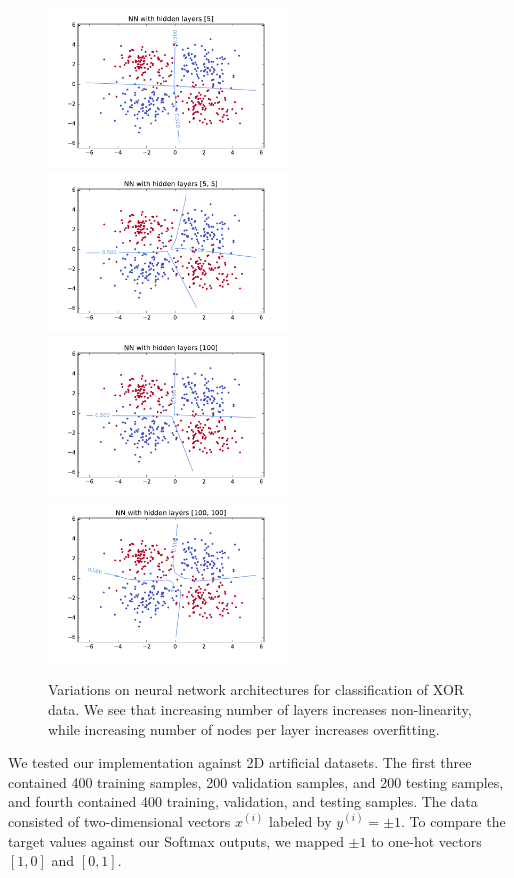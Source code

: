 \documentclass{article}
\newcommand{\sind}[1]{^{(#1)}}
\begin{document}
\begin{multicols}{2}
\begin{figure}[ht]
   \centering
   \includegraphics[width=2.5in]{img/p1/4-1small-382of400-16500.pdf}
   \includegraphics[width=2.5in]{img/p1/4-2small-380of400-3550.pdf}
   \includegraphics[width=2.5in]{img/p1/4-1large-380of400.pdf}
   \includegraphics[width=2.5in]{img/p1/4-2large-379of400-123000.pdf}
   \caption{Variations on neural network architectures for classification of
   XOR data. We see that increasing number of layers increases non-linearity,
   while increasing number of nodes per layer increases overfitting. 
   }
   \label{fig:1-2-arch}
\end{figure}

We tested our implementation against 2D artificial datasets.
The first three contained 400 training samples,
200 validation samples,
and 200 testing samples, and fourth contained 
400 training, validation, and testing samples.
The data consisted of two-dimensional vectors $x\sind{i}$ labeled by $y\sind{i} = \pm1$.
To compare the target values against our Softmax outputs, we mapped $\pm1$ to
one-hot vectors $[1,0]$ and $[0,1]$.


\end{multicols}
\end{document}
